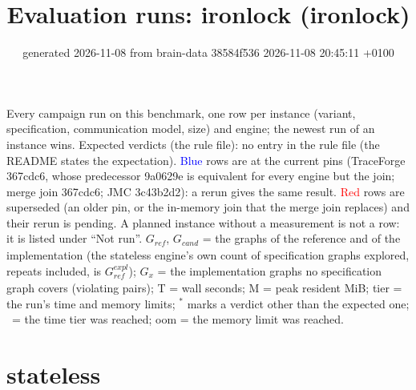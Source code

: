 \documentclass[10pt]{article}
\title{Evaluation runs: \textsf{ironlock} (ironlock)}
\author{}
\date{generated 2026-11-08 from brain-data 38584f536 2026-11-08 20:45:11 +0100}
\begin{document}
\maketitle\small
\noindent Every campaign run on this benchmark, one row per instance (variant, specification, communication model, size) and engine; the newest run of an instance wins. Expected verdicts (the rule file): no entry in the rule file (the README states the expectation). \textcolor{blue}{Blue} rows are at the current pins (TraceForge 367cdc6, whose predecessor 9a0629e is equivalent for every engine but the join; merge join 367cdc6; JMC 3c43b2d2): a rerun gives the same result. \textcolor{red}{Red} rows are superseded (an older pin, or the in-memory join that the merge join replaces) and their rerun is pending. A planned instance without a measurement is not a row: it is listed under ``Not run''. $G_{\mathit{ref}}$, $G_{\mathit{cand}}$ = the graphs of the reference and of the implementation (the stateless engine's own count of specification graphs explored, repeats included, is $G_{\mathit{ref}}^{\mathit{expl}}$); $G_x$ = the implementation graphs no specification graph covers (violating pairs); T = wall seconds; M = peak resident MiB; tier = the run's time and memory limits; $^{\ast}$ marks a verdict other than the expected one; \faClock\ = the time tier was reached; oom = the memory limit was reached.

\section*{stateless}
\end{document}
